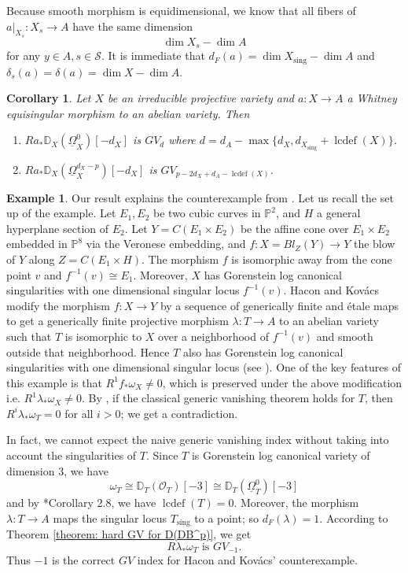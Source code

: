 \documentclass[11pt]{amsart}
\newtheorem{corollary}[equation]{Corollary}
\theoremstyle{definition}
\newtheorem{example}[equation]{Example}
\theoremstyle{plain}
\renewcommand{\O}{\mathcal O}
\newcommand{\PP}{\mathbb P}
\newcommand{\DD}{\mathbb D}
\newcommand{\sS}{\mathscr S}
\newcommand{\DB}{\underline{\Omega}} %
\DeclareMathOperator{\sing}{sing}
\DeclareMathOperator{\lcdef}{lcdef}
\newcommand{\Kovacs}{Kov\'acs}
\begin{document}
Because smooth morphism is equidimensional, we know that all fibers of $a|_{X_s}:X_s \to A$ have the same dimension 
\[\dim X_s - \dim A\]
for any $y\in A, s\in \sS$. It is immediate that $d_F(a) = \dim X_{\sing} - \dim A$ and $\delta_s(a) = \delta(a) = \dim X - \dim A$. 

\begin{corollary}
    Let $X$ be an irreducible projective variety and $a: X \to A$ a Whitney equisingular morphism to an abelian variety. Then 
    \begin{enumerate}
        \item $R a_* \DD_X(\DB^0_X)[-d_X]$ is $GV_{d}$ where $d=d_A - \max\{d_X, d_{X_{\sing}}+\lcdef(X)\}$. 
        \item $R a_* \DD_X(\DB^{d_X-p}_X)[-d_X]$ is $GV_{p-2d_X+d_A-\lcdef(X)}$.
    \end{enumerate}
\end{corollary}

\medskip

\begin{example}
    Our result explains the counterexample from \cite[Theorem 1]{Hacon-counter_eg_for_GV}. Let us recall the set up of the example. Let $E_1, E_2$ be two cubic curves in $\PP^2$, and $H$ a general hyperplane section of $E_2$. Let $Y = C(E_1\times E_2)$ be the affine cone over $E_1\times E_2$ embedded in $\PP^8$ via the Veronese embedding, and $f:X=Bl_Z(Y) \to Y$ the blow of $Y$ along $Z = C(E_1\times H)$. The morphism $f$ is isomorphic away from the cone point $v$ and $f^{-1}(v) \cong E_1$. Moreover, $X$ has Gorenstein log canonical singularities with one dimensional singular locus $f^{-1}(v)$. Hacon and Kovács modify the morphism $f:X\to Y$ by a sequence of generically finite and \'etale maps to get a generically finite projective morphism $\lambda: T \to A$ to an abelian variety such that $T$ is isomorphic to $X$ over a neighborhood of $f^{-1}(v)$ and smooth outside that neighborhood. Hence $T$ also has Gorenstein log canonical singularities with one dimensional singular locus (see \cite[Proposition 3.13]{Hacon-counter_eg_for_GV}). One of the key features of this example is that $R^1f_* \omega_X \neq 0$, which is preserved under the above modification i.e. $R^1\lambda_* \omega_X \neq 0$. By \cite[Proposition 4.1]{Hacon-counter_eg_for_GV}, if the classical generic vanishing theorem holds for $T$, then $R^i \lambda_* \omega_T = 0$ for all $i > 0$; we get a contradiction. 
    
    In fact, we cannot expect the naive generic vanishing index without taking into account the singularities of $T$. Since $T$ is Gorenstein log canonical variety of dimension $3$, we have 
    \[\omega_T \cong \DD_T(\O_T)[-3] \cong \DD_T(\DB^0_T)[-3]\]
    and by \cite{dao-takagi_lcdef_bound}*{Corollary 2.8}, we have $\lcdef(T) = 0$. Moreover, the morphism $\lambda: T \to A$ maps the singular locus $T_{\sing}$ to a point; so $d_F(\lambda) = 1$. According to Theorem \ref{theorem: hard GV for D(DB^p)}, we get
    \[R\lambda_*\omega_T \text{ is } GV_{-1}.\]
    Thus $-1$ is the correct $GV$ index for Hacon and \Kovacs{}' counterexample. 
\end{example}
\end{document}
